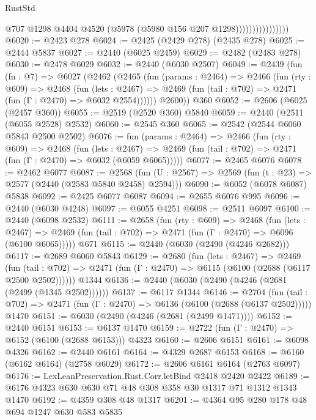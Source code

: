 \begin{lexlean}{RustStd}
\begin{coremodule}
                                @707
                                @1298
                                @4404
                                @4520
                                (@5978 (@5980 @156 @207 @1298))))))))))))))))
@6020 := @2423 @278
@6024 := @2425 (@2429 @278) (@2435 @278)
@6025 := @2444 @5837
@6027 := @2440 (@6025 @2459)
@6029 := @2482 (@2483 @278)
@6030 := @2478 @6029
@6032 := @2440 (@6030 @2507)
@6049 := @2439
    (fun (fn : @7) =>
    @6027
      (@2462
        (@2465
          (fun (params : @2464) =>
          @2466
            (fun (rty : @609) =>
            @2468
              (fun (lets : @2467) =>
              @2469 (fun (tail : @702) => @2471 (fun (Γ : @2470) => @6032 @2554))))))
        @2600))
    @360
@6052 := @2606 (@6025 (@2457 @360))
@6055 := @2519 (@2520 @360) @5840
@6059 := @2440 (@2511 (@6055 @2528) @2532)
@6060 := @2545 @360
@6065 := @2542 (@2544 @6060 @5843 @2500 @2502)
@6076 := fun (params : @2464) =>
  @2466
    (fun (rty : @609) =>
    @2468
      (fun (lets : @2467) =>
      @2469 (fun (tail : @702) => @2471 (fun (Γ : @2470) => @6032 (@6059 @6065)))))
@6077 := @2465 @6076
@6078 := @2462 @6077
@6087 := @2568 (fun (U : @2567) => @2569 (fun (t : @23) => @2577 (@2440 (@2583 @5840 @2458) @2594)))
@6090 := @6052 (@6078 @6087) @5838
@6092 := @2425 @6077 @6087
@6094 := @2655 @6076 @995
@6096 := @2440 (@6030 @4248)
@6097 := @6055 @4251
@6098 := @2511 @6097
@6100 := @2440 (@6098 @2532)
@6111 := @2658
    (fun (rty : @609) =>
    @2468
      (fun (lets : @2467) =>
      @2469 (fun (tail : @702) => @2471 (fun (Γ : @2470) => @6096 (@6100 @6065)))))
    @671
@6115 := @2440 (@6030 (@2490 (@4246 @2682)))
@6117 := @2689 @6060 @5843
@6129 := @2680
    (fun (lets : @2467) =>
    @2469
      (fun (tail : @702) => @2471 (fun (Γ : @2470) => @6115 (@6100 (@2688 (@6117 @2500 @2502))))))
    @1344
@6136 := @2440 (@6030 (@2490 (@4246 (@2681 (@2499 (@1345 @2502))))))
@6137 := @6117 @1344
@6146 := @2704
    (fun (tail : @702) => @2471 (fun (Γ : @2470) => @6136 (@6100 (@2688 (@6137 @2502)))))
    @1470
@6151 := @6030 (@2490 (@4246 (@2681 (@2499 @1471))))
@6152 := @2440 @6151
@6153 := @6137 @1470
@6159 := @2722 (fun (Γ : @2470) => @6152 (@6100 (@2688 @6153))) @4323
@6160 := @2606 @6151
@6161 := @6098 @4326
@6162 := @2440 @6161
@6164 := @4329 @2687 @6153
@6168 := @6160 (@6162 @6164) (@2758 @6029)
@6172 := @2606 @6161 @6164 (@2763 @6097)
@6176 := LexLeanPreservation.Rust.Corr.letBind @2418 @2420 @2422
@6189 := @6176 @4323 @630 @630 @71 @48 @308 @358 @30 @1317 @71 @1312 @1343 @1470
@6192 := @4359 @308 @48 @1317
@6201 := @4364 @95 @280 @178 @48 @694 @1247 @630 @583 @5835

\end{coremodule}
\end{lexlean}
